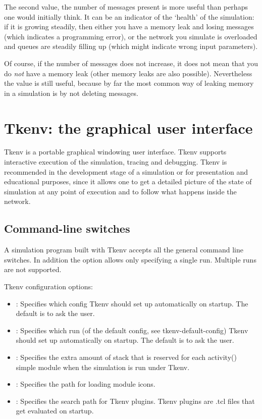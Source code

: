 The second value, the number of messages present is more useful than
perhaps one would initially think. It can be an indicator of the `health' of the simulation:
if it is growing steadily, then either you have a memory leak and losing
messages (which indicates a programming error), or the network you simulate is
overloaded and queues are steadily filling up (which might indicate wrong input
parameters).

Of course, if the number of messages does not increase, it does not mean
that you do \textit{not} have a memory leak (other memory leaks are also
possible). Nevertheless the value is still useful, because by far the
most common way of leaking memory in a simulation is by not deleting messages.



\section{Tkenv: the graphical user interface}

Tkenv is a portable graphical windowing user interface.
Tkenv supports interactive execution of the simulation, tracing and
debugging. Tkenv is recommended in the
development stage of a simulation or for presentation and educational
purposes, since it allows one to get a detailed picture of the state
of simulation at any point of execution and to follow what happens
inside the network.

\subsection{Command-line switches}

A simulation program built with Tkenv accepts all the general command line
switches. In addition the 
option allows only specifying a single run. Multiple runs are not supported.

Tkenv configuration options:
\begin{itemize}
  \item{:
    Specifies which config Tkenv should set up automatically on startup. The
    default is to ask the user.}

  \item{: Specifies which run (of the default
    config, see tkenv-default-config) Tkenv
    should set up automatically on startup. The default is to ask the user.}

  \item{:
    Specifies the extra amount of stack that is reserved for each activity()
    simple module when the simulation is run under Tkenv.}

  \item{: Specifies the path for loading module icons.}

  \item{:
    Specifies the search path for Tkenv plugins. Tkenv plugins are .tcl files
    that get evaluated on startup.}
\end{itemize}

